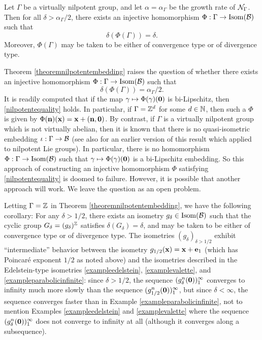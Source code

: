 \begin{theorem}
\label{theoremnilpotentembedding}
Let $\Gamma$ be a virtually nilpotent group, and let $\alpha = \alpha_\Gamma$ be the growth rate of $\mathcal N_\Gamma$. Then for all $\delta > \alpha_\Gamma/2$, there exists an injective homomorphism $\Phi:\Gamma\to\operatorname{Isom}(\mathcal B)$ such that
\[
\delta(\Phi(\Gamma)) = \delta.
\]
Moreover, $\Phi(\Gamma)$ may be taken to be either of convergence type or of divergence type.
\end{theorem}

\begin{remark}
\label{remarknilpotentembedding}
Theorem \ref{theoremnilpotentembedding} raises the question of whether there exists an injective homomorphism $\Phi:\Gamma\to\operatorname{Isom}(\mathcal B)$ such that
\begin{equation}
\label{nilpotentequality}
\delta(\Phi(\Gamma)) = \alpha_\Gamma/2.
\end{equation}
It is readily computed that if the map $\gamma\mapsto \Phi(\gamma)(\mathbf 0)$ is bi-Lipschitz, then \eqref{nilpotentequality} holds. In particular, if $\Gamma = \Z^d$ for some $d\in\N$, then such a $\Phi$ is given by $\Phi(\mathbf n)(\mathbf x) = \mathbf x + (\mathbf n,\mathbf 0)$. By contrast, if $\Gamma$ is a virtually nilpotent group which is not virtually abelian, then it is known \cite[Theorem 1.3]{CTV1} that there is no quasi-isometric embedding $\iota:\Gamma\to\mathcal B$ (see also \cite[Theorem A]{Pauls} for an earlier version of this result which applied to nilpotent Lie groups). In particular, there is no homomorphism $\Phi:\Gamma\to\operatorname{Isom}(\mathcal B)$ such that $\gamma\mapsto \Phi(\gamma)(\mathbf 0)$ is a bi-Lipschitz embedding. So this approach of constructing an injective homomorphism $\Phi$ satisfying \eqref{nilpotentequality} is doomed to failure. However, it is possible that another approach will work. We leave the question as an open problem.
\end{remark}
\begin{remark}
\label{remarknilpotentembedding2}
Letting $\Gamma = \Z$ in Theorem \ref{theoremnilpotentembedding}, we have the following corollary: For any $\delta > 1/2$, there exists an isometry $g_\delta\in\operatorname{Isom}(\mathcal B)$ such that the cyclic group $G_\delta = (g_\delta)^\Z$ satisfies $\delta(G_\delta) = \delta$, and may be taken to be either of convergence type or of divergence type. The isometries $(g_\delta)_{\delta > 1/2}$ exhibit ``intermediate'' behavior between the isometry $g_{1/2}(\mathbf x) = \mathbf x + \mathbf e_1$ (which has Poincar\'e exponent $1/2$ as noted above) and the isometries described in the Edelstein-type isometries \ref{exampleedelstein}, \ref{examplevalette}, and \ref{exampleparabolicinfinite}: since $\delta > 1/2$, the sequence $(g_\delta^n(\mathbf 0))_1^\infty$ converges to infinity much more slowly than the sequence $(g_{1/2}^n(\mathbf 0))_1^\infty$, but since $\delta < \infty$, the sequence converges faster than in Example \ref{exampleparabolicinfinite}, not to mention Examples \ref{exampleedelstein} and \ref{examplevalette} where the sequence $(g_\delta^n(\mathbf 0))_1^\infty$ does not converge to infinity at all (although it converges along a subsequence).
\end{remark}


